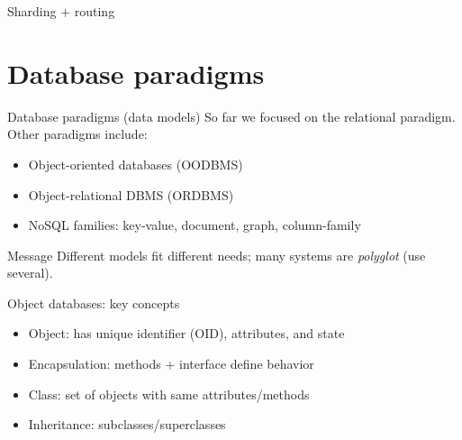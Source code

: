 \documentclass[10pt,aspectratio=169]{beamer}
\newenvironment{examplebox}[1][Example]{\begin{exampleblock}{#1}}{\end{exampleblock}}
\begin{document}
\begin{frame}{Sharding + routing}
\centering
{}
\end{frame}

\section{Database paradigms}

\begin{frame}{Database paradigms (data models)}
So far we focused on the relational paradigm. Other paradigms include:
\begin{itemize}
  \item Object-oriented databases (OODBMS)
  \item Object-relational DBMS (ORDBMS)
  \item NoSQL families: key-value, document, graph, column-family
\end{itemize}
\begin{examplebox}[Message]
Different models fit different needs; many systems are \emph{polyglot} (use several).
\end{examplebox}
\end{frame}

\begin{frame}{Object databases: key concepts}
\begin{itemize}
  \item Object: has unique identifier (OID), attributes, and state
  \item Encapsulation: methods + interface define behavior
  \item Class: set of objects with same attributes/methods
  \item Inheritance: subclasses/superclasses
\end{itemize}
\end{frame}
\end{document}
